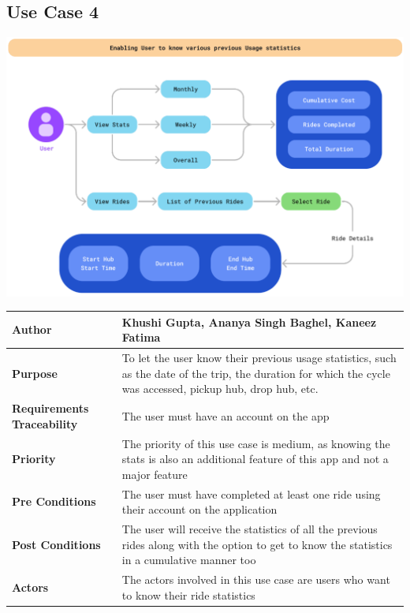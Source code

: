 \documentclass{scrreprt}
\begin{document}
\subsection{Use Case 4}
\begin{center}
\includegraphics*[scale=0.6]{usecase-4.png}\\
\vspace{5mm}
\begin{tabular}{|l|p{10cm}|}
    \hline
    \textbf{Author} & Khushi Gupta, Ananya Singh Baghel, Kaneez Fatima\\
    \hline
    \textbf{Purpose} &  To let the user know their previous usage statistics, such as the date of the trip, the duration for which the cycle was accessed, pickup hub, drop hub, etc.\\
    \hline
    \textbf{Requirements Traceability} & The user must have an account on the app\\
    \hline
    \textbf{Priority} &The priority of this use case is medium, as knowing the stats is also an additional feature of this app and not a major feature \\
    \hline
    \textbf{Pre Conditions} & The user must have completed at least one ride using their account on the application\\
    \hline
    \textbf{Post Conditions} & The user will receive the statistics of all the previous rides along with the option to get to know the statistics in a cumulative manner too\\
    \hline
    \textbf{Actors} &The actors involved in this use case are users who want to know their ride statistics \\
    \hline
\end{tabular}
\end{center}
\end{document}
